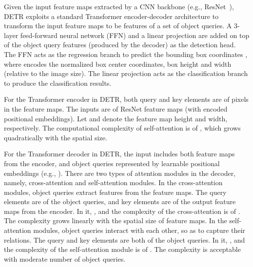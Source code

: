 \documentclass{article}
\begin{document}
Given the input feature maps  extracted by a CNN backbone (e.g., ResNet~\citep{he2016deep}), DETR exploits a standard Transformer encoder-decoder architecture to transform the input feature maps to be features of a set of object queries. A 3-layer feed-forward neural network (FFN) and a linear projection are added on top of the object query features (produced by the decoder) as the detection head. The FFN acts as the regression branch to predict the bounding box coordinates , where  encodes the normalized box center coordinates, box height and width (relative to the image size). The linear projection acts as the classification branch to produce the classification results.



For the Transformer encoder in DETR, both query and key elements are of pixels in the feature maps. The inputs are of ResNet feature maps (with encoded positional embeddings). Let  and  denote the feature map height and width, respectively. The computational complexity of self-attention is of , which grows quadratically with the spatial size. 



For the Transformer decoder in DETR, the input includes both feature maps from the encoder, and  object queries represented by learnable positional embeddings (e.g., ). There are two types of attention modules in the decoder, namely, cross-attention and self-attention modules.
In the cross-attention modules, object queries extract features from the feature maps. The query elements are of the object queries, and key elements are of the output feature maps from the encoder. In it, ,  and the complexity of the cross-attention is of . The complexity grows linearly with the spatial size of feature maps. In the self-attention modules, object queries interact with each other, so as to capture their relations. The query and key elements are both of the object queries. In it, , and the complexity of the self-attention module is of . The complexity is acceptable with moderate number of object queries.
\end{document}
